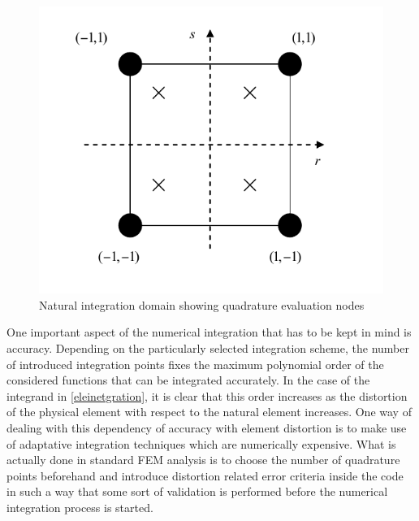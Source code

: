 
 \begin{figure}[h]
\centering
\includegraphics[width=12cm]{img/figure4.pdf}
\caption{Natural integration domain showing quadrature evaluation nodes}
\label{fig:integration domain}
\end{figure}	 


One important aspect of the numerical integration that has to be kept in mind is accuracy.  Depending on the particularly selected integration scheme, the number of introduced integration points fixes the maximum polynomial order of the considered functions that can be integrated accurately.  In the case of the integrand in \eqref{eleinetgration}, it is clear that this order increases as the distortion of the physical element  with respect to the natural element increases.  One way of dealing with this dependency of accuracy with element distortion is to make use of adaptative integration techniques which are numerically expensive.  What is actually done in standard FEM analysis is to choose the number of quadrature points beforehand and introduce distortion related error criteria inside the code in such a way that some sort of validation is performed before the numerical integration process is started.